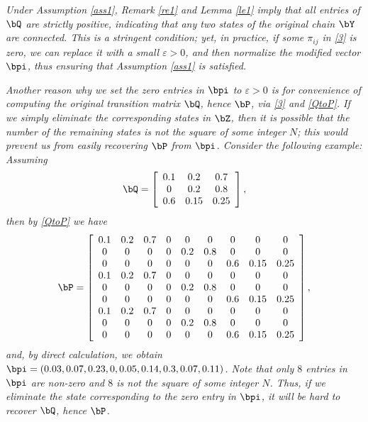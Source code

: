 \documentclass[10pt, twocolumn]{IEEEtran}
\begin{document}
\begin{rem} \label{re2} \emph{Under Assumption \ref{ass1}, Remark \ref{re1}
    and Lemma \ref{le1} imply that all entries of $\bQ$ are strictly
    positive, indicating that any two states of the original chain $\bY$
    are connected. This is a stringent condition; yet, in practice, if
    some $\pi_{ij}$ in \eqref{3} is zero, we can replace it with a small
    $\varepsilon > 0$, and then normalize the modified vector ${\bpi}$,
    thus ensuring that Assumption \ref{ass1} is satisfied.}

  \emph{Another reason why we set the zero entries in ${\bpi}$ to
    $\varepsilon > 0$ is for convenience of computing the original
    transition matrix $\bQ$, hence $\bP$, via \eqref{3} and
    \eqref{QtoP}. If we simply eliminate the corresponding states in
    $\bZ$, then it is possible that the number of the remaining
    states is not the square of some integer $N$; this would prevent us
    from easily recovering $\bP$ from ${\bpi}$. Consider the following
    example: Assuming
\[\bQ = \left[ {\begin{array}{*{20}{c}}
  {0.1}&{0.2}&{0.7} \\ 
  0&{0.2}&{0.8} \\ 
  {0.6}&{0.15}&{0.25} 
\end{array}} \right],\]
then by \eqref{QtoP} we have
\[\bP = \left[ {\begin{array}{*{20}{c}}
  {0.1}&{0.2}&{0.7}&0&0&0&0&0&0 \\ 
  0&0&0&0&{0.2}&{0.8}&0&0&0 \\ 
  0&0&0&0&0&0&{0.6}&{0.15}&{0.25} \\ 
  {0.1}&{0.2}&{0.7}&0&0&0&0&0&0 \\ 
  0&0&0&0&{0.2}&{0.8}&0&0&0 \\ 
  0&0&0&0&0&0&{0.6}&{0.15}&{0.25} \\ 
  {0.1}&{0.2}&{0.7}&0&0&0&0&0&0 \\ 
  0&0&0&0&{0.2}&{0.8}&0&0&0 \\ 
  0&0&0&0&0&0&{0.6}&{0.15}&{0.25} 
\end{array}} \right],
\]
and, by direct calculation, we obtain $\bpi = (0.03, 0.07, 0.23, 0,
\linebreak[3] 0.05, 0.14, 0.3, 0.07, 0.11)$.  Note that only $8$ entries
in $\bpi$ are non-zero and $8$ is not the square of some integer
$N$. Thus, if we eliminate the state corresponding to the zero entry in
$\bpi$, it will be hard to recover $\bQ$, hence $\bP$.}
\end{rem}
\end{document}

